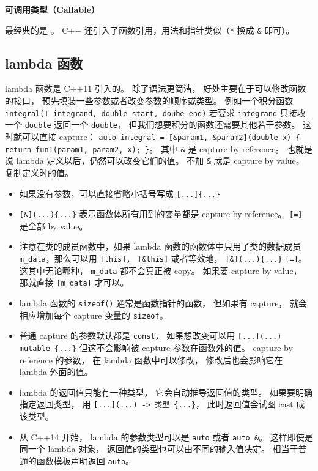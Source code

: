

\textbf{可调用类型（Callable）}

最经典的是 。 C++ 还引入了函数引用，用法和指针类似（\verb`*` 换成 \verb`&` 即可）。

\subsection{lambda 函数}
lambda 函数是 C++11 引入的。 除了语法更简洁， 好处主要在于可以修改函数的接口， 预先填装一些参数或者改变参数的顺序或类型。 例如一个积分函数 \verb`integral(T integrand, double start, doube end)` 若要求 \verb`integrand` 只接收一个 \verb`double` 返回一个 \verb`double`， 但我们想要积分的函数还需要其他若干参数。 这时就可以直接 capture： \verb`auto integral = [&param1, &param2](double x) { return fun1(param1, param2, x); }`。 其中 \verb`&` 是 capture by reference。 也就是说 lambda 定义以后，仍然可以改变它们的值。 不加 \verb`&` 就是 capture by value， 复制定义时的值。

\begin{itemize}
\item 如果没有参数，可以直接省略小括号写成 \verb`[...]{...}`
\item \verb`[&](...){...}` 表示函数体所有用到的变量都是 capture by reference。 \verb`[=]` 是全部 by value。
\item 注意在类的成员函数中，如果 lambda 函数的函数体中只用了类的数据成员 \verb`m_data`，那么可以用 \verb`[this]`， \verb`[&this]` 或者等效地， \verb`[&](...){...}` \verb`[=]`。 这其中无论哪种， \verb`m_data` 都不会真正被 copy。 如果要 capture by value， 那就直接 \verb`[m_data]` 才可以。
\item lambda 函数的 \verb`sizeof()` 通常是函数指针的函数， 但如果有 capture， 就会相应增加每个 capture 变量的 \verb`sizeof`。
\item 普通 capture 的参数默认都是 \verb`const`， 如果想改变可以用 \verb`[...](...) mutable {...}` 但这不会影响被 capture 参数在函数外的值。 capture by reference 的参数， 在 lambda 函数中可以修改， 修改后也会影响它在 lambda 外面的值。
\item lambda 的返回值只能有一种类型， 它会自动推导返回值的类型。 如果要明确指定返回类型， 用 \verb`[...](...) -> 类型 {...}`， 此时返回值会试图 cast 成该类型。
\item 从 C++14 开始， lambda 的参数类型可以是 \verb`auto` 或者 \verb`auto &`。 这样即使是同一个 lambda 对象， 返回值的类型也可以由不同的输入值决定。 相当于普通的函数模板声明返回 \verb`auto`。
\end{itemize}

